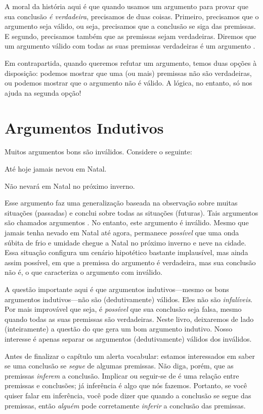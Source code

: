 A moral da história aqui é que quando usamos um argumento para provar que sua conclusão \emph{é verdadeira}, precisamos de duas coisas.
Primeiro, precisamos que o argumento seja válido, ou seja, precisamos que a conclusão se siga das premissas.
E segundo, precisamos também que as premissas sejam verdadeiras.
Diremos que um argumento válido com todas as suas premissas verdadeiras é um argumento .

Em contrapartida, quando queremos refutar um argumento, temos duas opções à disposição: podemos mostrar que uma (ou mais) premissas não são verdadeiras, ou podemos mostrar que o argumento não é válido.
A lógica, no entanto, só nos ajuda na segunda opção!


\section{Argumentos Indutivos}

Muitos argumentos bons são inválidos. Considere o seguinte:
	\begin{earg}
		\item[] Até hoje jamais nevou em Natal.
	\item[\therefore] Não nevará em Natal no próximo inverno.
\end{earg}
Esse argumento faz uma generalização baseada na observação sobre muitas situações (passadas) e conclui sobre todas as situações (futuras).
Tais argumentos são chamados argumentos .
No entanto, este argumento é inválido.
Mesmo que jamais tenha nevado em Natal até agora, permanece \emph{possível} que 
uma onda súbita de frio e umidade chegue a Natal no próximo inverno e neve na cidade.
Essa situação configura um cenário hipotético bastante implausível, mas ainda assim possível, em que a premissa do argumento é verdadeira, mas sua conclusão não é, o que caracteriza o argumento com inválido.

A questão importante aqui é que argumentos indutivos---mesmo os bons argumentos indutivos---não são (dedutivamente) válidos.
Eles não são \emph{infalíveis}.
Por mais improvável que seja, é \emph{possível} que sua conclusão seja falsa, mesmo quando todas as suas premissas são verdadeiras.
Neste livro, deixaremos de lado (inteiramente) a questão do que gera um bom argumento indutivo.
Nosso interesse é apenas separar os argumentos (dedutivamente) válidos dos inválidos.

Antes de finalizar o capítulo um alerta vocabular: estamos interessados em saber se uma conclusão se \emph{segue} de algumas premissas.
Não diga, porém, que as premissas \emph{inferem} a conclusão.
Implicar ou seguir-se de é uma relação entre premissas e conclusões; já inferência é algo que nós fazemos.
Portanto, se você quiser falar em inferência, você pode dizer que quando a conclusão se segue das premissas, então \emph{alguém} pode corretamente \emph{inferir} a conclusão das premissas.


